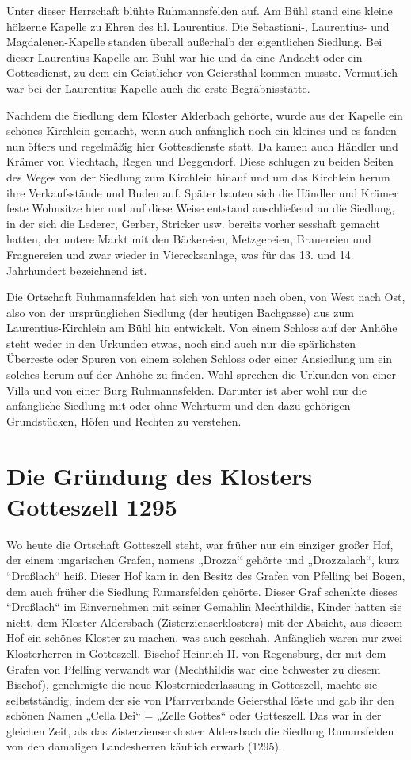 \documentclass[12pt,a4pager]{book}
\begin{document}
Unter dieser Herrschaft blühte Ruhmannsfelden auf. Am Bühl stand eine kleine
hölzerne Kapelle zu Ehren des hl. Laurentius. Die Sebastiani-, Laurentius- und
Magdalenen-Kapelle standen überall außerhalb der eigentlichen Siedlung. Bei
dieser Laurentius-Kapelle am Bühl war hie und da eine Andacht oder ein
Gottesdienst, zu dem ein Geistlicher von Geiersthal kommen musste. Vermutlich
war bei der Laurentius-Kapelle auch die erste Begräbnisstätte.

Nachdem die Siedlung dem Kloster Alderbach gehörte, wurde aus der Kapelle ein
schönes Kirchlein gemacht, wenn auch anfänglich noch ein kleines und es fanden
nun öfters und regelmäßig hier Gottesdienste statt. Da kamen auch Händler und
Krämer von Viechtach, Regen und Deggendorf. Diese schlugen zu beiden Seiten des
Weges von der Siedlung zum Kirchlein hinauf und um das Kirchlein herum ihre
Verkaufsstände und Buden auf. Später bauten sich die Händler und Krämer feste
Wohnsitze hier und auf diese Weise entstand anschließend an die Siedlung, in der
sich die Lederer, Gerber, Stricker usw. bereits vorher sesshaft gemacht hatten,
der untere Markt mit den Bäckereien, Metzgereien, Brauereien und Fragnereien und
zwar wieder in Vierecksanlage, was für das 13. und 14. Jahrhundert bezeichnend
ist.

Die Ortschaft Ruhmannsfelden hat sich von unten nach oben, von West nach Ost,
also von der ursprünglichen Siedlung (der heutigen Bachgasse) aus zum
Laurentius-Kirchlein am Bühl hin entwickelt. Von einem Schloss auf der Anhöhe
steht weder in den Urkunden etwas, noch sind auch nur die spärlichsten Überreste
oder Spuren von einem solchen Schloss oder einer Ansiedlung um ein solches herum
auf der Anhöhe zu finden. Wohl sprechen die Urkunden von einer Villa und von
einer Burg Ruhmannsfelden. Darunter ist aber wohl nur die anfängliche Siedlung
mit oder ohne Wehrturm und den dazu gehörigen Grundstücken, Höfen und Rechten zu
verstehen.

\section{Die Gründung des Klosters Gotteszell 1295}

Wo heute die Ortschaft Gotteszell steht, war früher nur ein einziger großer Hof,
der einem ungarischen Grafen, namens „Drozza“ gehörte und „Drozzalach“, kurz
“Droßlach“ heiß. Dieser Hof kam in den Besitz des Grafen von Pfelling bei Bogen,
dem auch früher die Siedlung Rumarsfelden gehörte. Dieser Graf schenkte dieses
“Droßlach“ im Einvernehmen mit seiner Gemahlin Mechthildis, Kinder hatten sie
nicht, dem Kloster Aldersbach (Zisterzienserklosters) mit der Absicht, aus
diesem Hof ein schönes Kloster zu machen, was auch geschah. Anfänglich waren nur
zwei Klosterherren in Gotteszell. Bischof Heinrich II. von Regensburg, der mit
dem Grafen von Pfelling verwandt war (Mechthildis war eine Schwester zu diesem
Bischof), genehmigte die neue Klosterniederlassung in Gotteszell, machte sie
selbstständig, indem der sie von Pfarrverbande Geiersthal löste und gab ihr den
schönen Namen „Cella Dei“ = „Zelle Gottes“ oder Gotteszell. Das war in der
gleichen Zeit, als das Zisterzienserkloster Aldersbach die Siedlung Rumarsfelden
von den damaligen Landesherren käuflich erwarb (1295).
\end{document}

